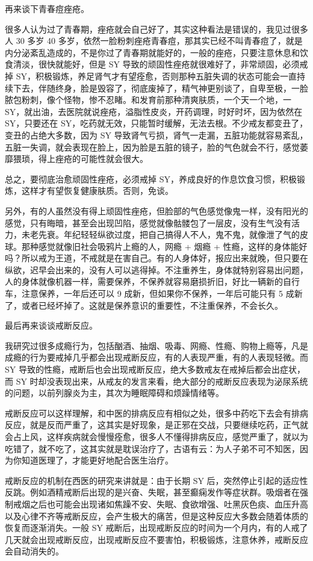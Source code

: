 \documentclass{ctexart}
\begin{document}
再来谈下青春痘痤疮。

很多人认为过了青春期，痤疮就会自己好了，其实这种看法是错误的，我见过很多人 30 多岁 40 多岁，依然一脸粉刺痤疮青春痘，那其实已经不叫青春痘了，就是内分泌紊乱造成的，不是你过了青春期就能好的，一般的痤疮，只要注意休息和饮食清淡，很快就能好，但是 SY 导致的顽固性痤疮就很难好了，非常顽固，必须戒掉 SY，积极锻炼，养足肾气才有望痊愈，否则那种五脏失调的状态可能会一直持续下去，伴随终身，脸是毁容了，彻底废掉了，精气神更别谈了，自卑至极，一脸脓包粉刺，像个怪物，惨不忍睹。和发育前那种清爽肤质，一个天一个地，一 SY，就出油，去医院就说痤疮，溢脂性皮炎，开药调理，时好时坏，因为依然在 SY，只要还在 SY，吃药就无效，只能暂时缓解，无法去根。不少戒友都变丑了，变丑的占绝大多数，因为 SY 导致肾气亏损，肾气一走漏，五脏功能就容易紊乱，五脏一失调，就会表现在脸上，因为脸是五脏的镜子，脸的气色就会不行，感觉萎靡猥琐，得上痤疮的可能性就会很大。

总之，要彻底治愈顽固性痤疮，必须戒掉 SY，养成良好的作息饮食习惯，积极锻炼，这样才有望恢复健康肤质。否则，免谈。

另外，有的人虽然没有得上顽固性痤疮，但脸部的气色感觉像鬼一样，没有阳光的感觉，只有晦暗，甚至会出现凹陷，感觉就像骷髅包了一层皮，没有生气没有活力，未老先衰。年纪轻轻纵欲过度，把自己搞得人不人，鬼不鬼，就像泄了气的皮球。那种感觉就像旧社会吸鸦片上瘾的人，网瘾 + 烟瘾 + 性瘾，这样的身体能好吗？所以戒为王道，不戒就是在害自己。有的人身体好，报应出来就晚，但只要在纵欲，迟早会出来的，没有人可以逃得掉。不注重养生，身体就特别容易出问题，人的身体就像机器一样，需要保养，不保养就容易磨损折旧，好比一辆新的自行车，注意保养，一年后还可以 9 成新，但如果你不保养，一年后可能只有 5 成新了，或者已经坏掉了。这就是保养意识的重要性，不注重保养，不会长久。

最后再来谈谈戒断反应。

我研究过很多成瘾行为，包括酗酒、抽烟、吸毒、网瘾、性瘾、购物上瘾等，凡是成瘾的行为要戒掉几乎都会出现戒断反应，有的人表现严重，有的人表现轻微。而 SY 导致的性瘾，戒断后也会出现戒断反应，绝大多数戒友在戒掉后都会出症状，而 SY 时却没表现出来，从戒友的发言来看，绝大部分的戒断反应表现为泌尿系统的问题，以前列腺炎为主，其次为睡眠障碍和烦躁情绪等。

戒断反应可以这样理解，和中医的排病反应有相似之处，很多中药吃下去会有排病反应，就是反而严重了，这其实是好现象，是正邪在交战，只要继续吃药，正气就会占上风，这样疾病就会慢慢痊愈，很多人不懂得排病反应，感觉严重了，就以为吃错了，就不吃了，这其实就是耽误治疗了，古语有云：为人子弟不可不知医，因为你知道医理了，才能更好地配合医生治疗。

戒断反应的机制在西医的研究来讲就是：由于长期 SY 后，突然停止引起的适应性反跳。例如酒精戒断后出现的是兴奋、失眠，甚至癫痫发作等症状群。吸烟者在强制戒烟之后也可能会出现诸如焦躁不安、失眠、食欲增强、吐黑灰色痰、血压升高以及心律不齐等戒断反应，会产生极大的痛苦，但是这种反应大多数会随着体质的恢复而逐渐消失。一般 SY 戒断后，出现戒断反应的时间为一个月内，有的人戒了几天就会出现戒断反应，出现戒断反应不要害怕，积极锻炼，注意休养，戒断反应会自动消失的。
\end{document}
